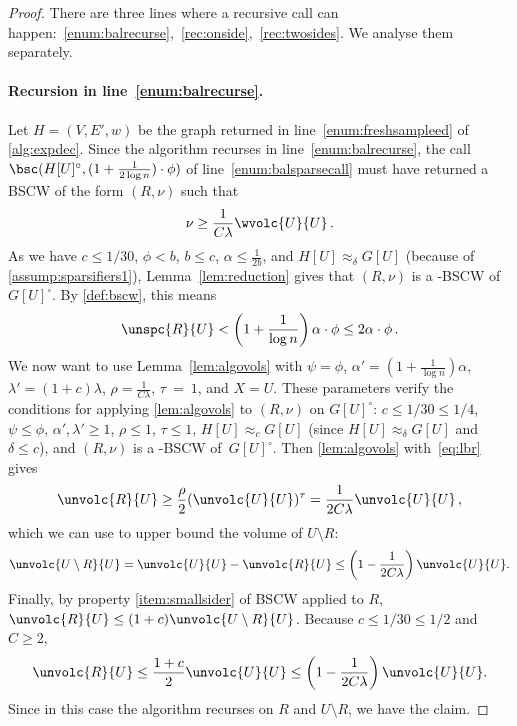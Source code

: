 \begin{proof}
	There are three lines where a recursive call can happen:~\eqref{enum:balrecurse},~\eqref{rec:onside},~\eqref{rec:twosides}. We analyse them separately.
	
	\paragraph{Recursion in line~\eqref{enum:balrecurse}.} Let $H=(V,E',w)$ be the graph returned in line~\eqref{enum:freshsampleed} of \cref{alg:expdec}. Since the algorithm recurses in line~\eqref{enum:balrecurse}, the call $ \bsc(H[U]^\circ, (1+\frac{1}{2 \log n}) \cdot \phi)$ of line~\eqref{enum:balsparsecall} must have returned a BSCW of the form $(R,\nu)$ such that
	\begin{equation}
		\label{eq:lbr}
		\nu \ge \frac{1}{C \lambda}\wvolc{U}{U} \, .
	\end{equation}
	As we have $c \le 1/30$, $\phi < b$, $b \le c$, $\alpha \le \frac{1}{2b}$, and $H[U] \approx_\delta G[U]$ (because of \cref{assump:sparsifiers1}),  Lemma~\ref{lem:reduction} gives that $(R,\nu)$ is a  -BSCW of~$G[U]^\circ$. By \cref{def:bscw}, this means
	\begin{equation*}
		\unspc{R}{U} < \left(1+\frac{1}{\log n}\right)\alpha\cdot \phi \le 2\alpha \cdot \phi \, .
	\end{equation*}
	We now want to use Lemma~\ref{lem:algovols} with $\psi = \phi$, $ \alpha'=(1+\frac{1}{\log n})\alpha$, $\lambda' =(1+c)\lambda$, $\rho= \frac{1}{C\lambda}$, $\tau~=~1$, and $X=U$. These parameters verify the conditions for applying \cref{lem:algovols} to $(R,\nu)$ on $G[U]^\circ$: $c \le 1/30 \le 1/4$, $\psi \le \phi$, $\alpha',\lambda' \ge 1$, $\rho \le 1$, $\tau \le 1$, $H[U] \approx_{c} G[U]$ (since $H[U] \approx_{\delta} G[U]$ and $\delta \le c$), and $(R,\nu)$ is a -BSCW of~$G[U]^\circ$. Then \cref{lem:algovols} with~\eqref{eq:lbr} gives
	\begin{equation*}
		\unvolc{R}{U} \geq  \frac{\rho}{2} (\unvolc{U}{U})^\tau = \frac{1}{2C\lambda} \unvolc{U}{U}\, ,
	\end{equation*}
	which we can use to upper bound the volume of $U \setminus R$:
	\begin{equation*}
		\unvolc{U \setminus R}{U} = \unvolc{U}{U} - \unvolc{R}{U} \leq \left( 1 -  \frac{1}{2C\lambda} \right) \unvolc{U}{U}.
	\end{equation*}
	Finally, by property \eqref{item:smallsider} of BSCW applied to $R$, $\unvolc{R}{U} \leq (1 + c) \unvolc{U \setminus R}{U}$. Because $c \leq 1/30 \le 1/2$ and $C \ge 2$,
	\begin{equation*}
		\unvolc{R}{U} \leq \frac{1+c}{2} \unvolc{U}{U} \leq \left( 1 -  \frac{1}{2C\lambda} \right) \unvolc{U}{U}.
	\end{equation*}
	Since in this case the algorithm recurses on $R$ and $U\setminus R$, we have the claim.
	

\end{proof}
